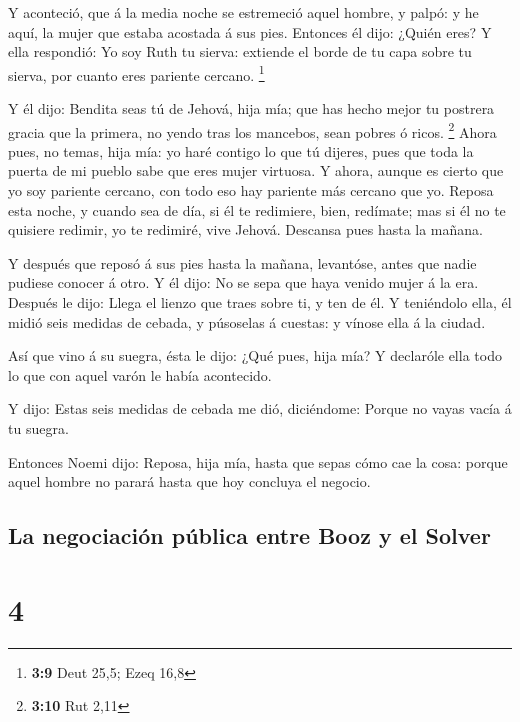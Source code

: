  Y aconteció, que á la media noche se estremeció aquel
hombre, y palpó: y he aquí, la mujer que estaba acostada á sus pies.
 Entonces él dijo: ¿Quién eres? Y ella respondió: Yo soy
Ruth tu sierva: extiende el borde de tu capa sobre tu sierva, por cuanto
eres pariente cercano. \footnote{\textbf{3:9} Deut 25,5; Ezeq 16,8}

 Y él dijo: Bendita seas tú de Jehová, hija mía; que has
hecho mejor tu postrera gracia que la primera, no yendo tras los
mancebos, sean pobres ó ricos. \footnote{\textbf{3:10} Rut 2,11}
 Ahora pues, no temas, hija mía: yo haré contigo lo que tú
dijeres, pues que toda la puerta de mi pueblo sabe que eres mujer
virtuosa.  Y ahora, aunque es cierto que yo soy pariente
cercano, con todo eso hay pariente más cercano que yo. 
Reposa esta noche, y cuando sea de día, si él te redimiere, bien,
redímate; mas si él no te quisiere redimir, yo te redimiré, vive Jehová.
Descansa pues hasta la mañana.

 Y después que reposó á sus pies hasta la mañana,
levantóse, antes que nadie pudiese conocer á otro. Y él dijo: No se sepa
que haya venido mujer á la era.  Después le dijo: Llega el
lienzo que traes sobre ti, y ten de él. Y teniéndolo ella, él midió seis
medidas de cebada, y púsoselas á cuestas: y vínose ella á la ciudad.

 Así que vino á su suegra, ésta le dijo: ¿Qué pues, hija
mía? Y declaróle ella todo lo que con aquel varón le había acontecido.

 Y dijo: Estas seis medidas de cebada me dió, diciéndome:
Porque no vayas vacía á tu suegra.

 Entonces Noemi dijo: Reposa, hija mía, hasta que sepas
cómo cae la cosa: porque aquel hombre no parará hasta que hoy concluya
el negocio.

\hypertarget{la-negociaciuxf3n-puxfablica-entre-booz-y-el-solver}{%
\subsection{La negociación pública entre Booz y el
Solver}\label{la-negociaciuxf3n-puxfablica-entre-booz-y-el-solver}}

\hypertarget{section-3}{%
\section{4}\label{section-3}}

